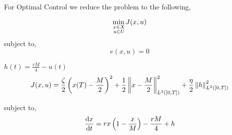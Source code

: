 For Optimal Control we reduce the problem to the following,


\begin{equation}
{\displaystyle {\underset {\substack{x\in X \\ u \in U}}{\min\, }}J(x,u)}
\end{equation}
subject to,
\begin{equation}
	e(x,u)=0
\end{equation}

$h(t)=\frac{rM}{4}-u(t)$
\begin{equation}
	J(x,u)=\frac{\zeta}{2} \left(x(T)-\frac{M}{2}\right)^2+\frac{1}{2}\left\lVert x-\frac{M}{2} \right\rVert^2_{L^2([0,T])}+\frac{\eta}{2}\left\lVert h \right\rVert^2_{L^2([0,T])}
\end{equation}

subject to,
\begin{equation}
	\frac{\mathrm{d} x}{{\mathrm{d} t}}=rx\left(1-\frac{x}{M}\right)-\frac{rM}{4}+h
\end{equation}